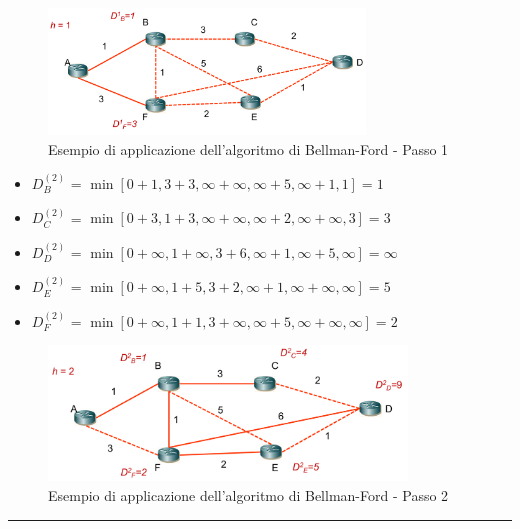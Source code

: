 \begin{figure}[h!]
    \centering
    \includegraphics[width=0.75\textwidth]{images/bf2.png}
    \caption{Esempio di applicazione dell'algoritmo di Bellman-Ford - Passo 1}
    \label{fig:bf2}
\end{figure}

\newpage


\begin{itemize}
    \item $D_B^{(2)}$ = $\min [0 + 1, 3 + 3, \infty + \infty, \infty + 5, \infty + 1, 1] = 1$
    \item $D_C^{(2)}$ = $\min [0 + 3, 1 + 3, \infty + \infty, \infty + 2, \infty + \infty, 3] = 3$
    \item $D_D^{(2)}$ = $\min [0 + \infty, 1 + \infty, 3 + 6, \infty + 1, \infty + 5, \infty] = \infty$
    \item $D_E^{(2)}$ = $\min [0 + \infty, 1 + 5, 3 + 2, \infty + 1, \infty + \infty, \infty] = 5$
    \item $D_F^{(2)}$ = $\min [0 + \infty, 1 + 1, 3 + \infty, \infty + 5, \infty + \infty, \infty] = 2$
\end{itemize}

\begin{figure}[h!]
    \centering
    \includegraphics[width=0.85\textwidth]{images/bf3.png}
    \caption{Esempio di applicazione dell'algoritmo di Bellman-Ford - Passo 2}
    \label{fig:bf3}
\end{figure}

\vspace{1em}
\noindent\rule{\linewidth}{0.4pt}
\vspace{1em}


